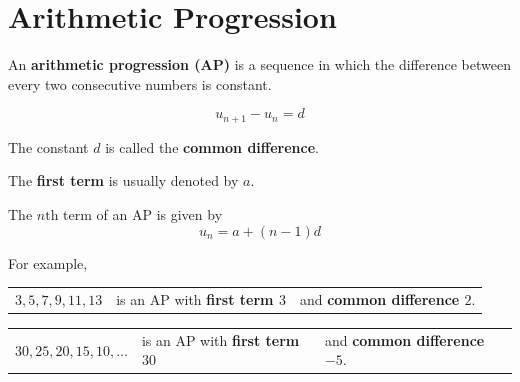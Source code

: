 \documentclass[11pt,a4paper]{book}
\begin{document}
\section{Arithmetic Progression}

\begin{tcolorbox}[colback=blue!5, colframe=black, boxrule=.4pt, sharpish corners]

An \textbf{arithmetic progression (AP)} is a sequence in which the
difference between every two consecutive numbers is constant.

\[
u_{n+1}-u_{n}=d
\]

The constant $d$ is called the \textbf{common difference}. 

\medskip{}

The \textbf{first term} is usually denoted by $a$. 

\medskip{}

The $n\text{th}$ term of an AP is given by 
\[
u_{n}=a+\left(n-1\right)d
\]
\end{tcolorbox}

For example, 

\begin{tasks}[label=(\alph*),label-width=3.5ex] 

\task  %
\begin{tabular}{>{\raggedright}p{3cm}>{\raggedright}p{4.4cm}>{\raggedright}p{5cm}}
$3,5,7,9,11,13$ & is an AP with \textbf{first term $3$} & and \textbf{common difference $2$}.\tabularnewline
\end{tabular}

\task  %
\begin{tabular}{>{\raggedright}p{3cm}>{\raggedright}p{4.4cm}>{\raggedright}p{5cm}}
$30,25,20,15,10,\ldots$ & is an AP with \textbf{first term $30$} & and \textbf{common difference $-5$}.\tabularnewline
\end{tabular}

\end{tasks}
\end{document}
